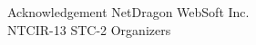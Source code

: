 \documentclass[final,hyperref={pdfpagelabels=false}]{beamer}
\begin{document}
\begin{frame}{}
\begin{columns}[t]
\begin{column}{.49\linewidth}
        \begin{block}{Acknowledgement}
          NetDragon WebSoft Inc. \\
          NTCIR-13 STC-2 Organizers
        \end{block}

      \end{column}
    \end{columns}
  \end{frame}
\end{document}
